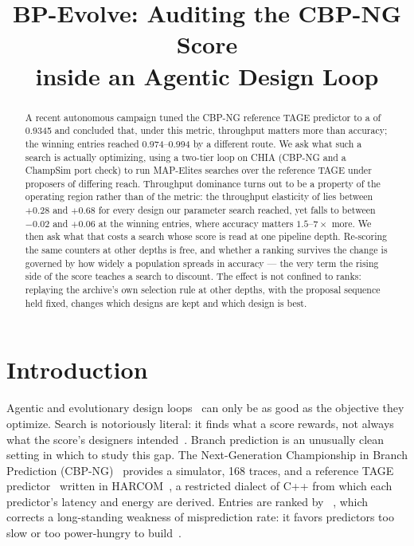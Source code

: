 \documentclass[conference]{IEEEtran}
\newcommand{\vfs}{\text{VFS}}
\begin{document}
\title{BP-Evolve: Auditing the CBP-NG Score\\inside an Agentic Design Loop}

\author{
\and
{}
}

\maketitle

\begin{abstract}
A recent autonomous campaign tuned the CBP-NG reference TAGE predictor to a
\vfs{} of 0.9345 and concluded that, under this metric, throughput matters more
than accuracy; the winning entries reached 0.974--0.994 by a different route.
We ask what such a search is actually optimizing, using a two-tier loop on
CHIA (CBP-NG and a ChampSim port check) to run MAP-Elites searches over the
reference TAGE under proposers of differing reach. Throughput
dominance turns out to be a property of the operating region rather than of the
metric: the throughput elasticity of \vfs{} lies between $+0.28$ and $+0.68$ for
every design our parameter search reached, yet falls to between $-0.02$ and $+0.06$ at the
winning entries, where accuracy matters $1.5$--$7\times$ more. We then ask what
that costs a search whose score is read at one pipeline depth. Re-scoring the
same counters at other depths is free, and whether a ranking survives the change
is governed by how widely a population spreads in accuracy --- the very term the
rising side of the score teaches a search to discount.
The effect is not confined to ranks: replaying the archive's own selection rule
at other depths, with the proposal sequence held fixed, changes which designs
are kept and which design is best.
\end{abstract}

\section{Introduction}

Agentic and evolutionary design loops~\cite{alphaevolve,archgym,funsearch,elm}
can only be as good as the objective they optimize. Search is notoriously
literal: it finds what a score rewards, not always what the score's designers
intended~\cite{lehman2020surprising,amodei2016concrete}. Branch prediction is an
unusually clean setting in which to study this gap. The Next-Generation
Championship in Branch Prediction (CBP-NG)~\cite{cbpng} provides a simulator,
168 traces, and a reference TAGE predictor~\cite{seznec2006tage,seznec2011tage}
written in HARCOM~\cite{harcom}, a restricted dialect of C++ from which each
predictor's latency and energy are derived. Entries are ranked by
\vfs{}~\cite{vfsmetric}, which corrects a long-standing weakness of misprediction
rate: it favors predictors too slow or too power-hungry to
build~\cite{jimenez2000delay,jimenez2003reconsidering}.
\end{document}
